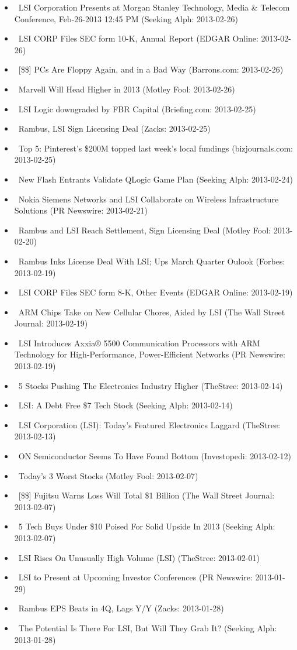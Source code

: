 \documentclass[11pt,asymmetric]{article}
\begin{document}
\begin{itemize}
\item\ LSI Corporation Presents at Morgan Stanley Technology, Media \& Telecom Conference, Feb-26-2013 12:45 PM (Seeking Alph: 2013-02-26)
\item\ LSI CORP Files SEC form 10-K, Annual Report (EDGAR Online: 2013-02-26)
\item\ [\$\$] PCs Are Floppy Again, and in a Bad Way (Barrons.com: 2013-02-26)
\item\ Marvell Will Head Higher in 2013 (Motley Fool: 2013-02-26)
\item\ LSI Logic downgraded by FBR Capital (Briefing.com: 2013-02-25)
\item\ Rambus, LSI Sign Licensing Deal (Zacks: 2013-02-25)
\item\ Top 5: Pinterest's \$200M topped last week's local fundings (bizjournals.com: 2013-02-25)
\item\ New Flash Entrants Validate QLogic Game Plan (Seeking Alph: 2013-02-24)
\item\ Nokia Siemens Networks and LSI Collaborate on Wireless Infrastructure Solutions (PR Newswire: 2013-02-21)
\item\ Rambus and LSI Reach Settlement, Sign Licensing Deal (Motley Fool: 2013-02-20)
\item\ Rambus Inks License Deal With LSI; Ups March Quarter Oulook (Forbes: 2013-02-19)
\item\ LSI CORP Files SEC form 8-K, Other Events (EDGAR Online: 2013-02-19)
\item\ ARM Chips Take on New Cellular Chores, Aided by LSI (The Wall Street Journal: 2013-02-19)
\item\ LSI Introduces Axxia® 5500 Communication Processors with ARM Technology for High-Performance, Power-Efficient Networks (PR Newswire: 2013-02-19)
\item\ 5 Stocks Pushing The Electronics Industry Higher (TheStree: 2013-02-14)
\item\ LSI: A Debt Free \$7 Tech Stock (Seeking Alph: 2013-02-14)
\item\ LSI Corporation (LSI): Today's Featured Electronics Laggard (TheStree: 2013-02-13)
\item\ ON Semiconductor Seems To Have Found Bottom (Investopedi: 2013-02-12)
\item\ Today's 3 Worst Stocks (Motley Fool: 2013-02-07)
\item\ [\$\$] Fujitsu Warns Loss Will Total \$1 Billion (The Wall Street Journal: 2013-02-07)
\item\ 5 Tech Buys Under \$10 Poised For Solid Upside In 2013 (Seeking Alph: 2013-02-07)
\item\ LSI Rises On Unusually High Volume (LSI) (TheStree: 2013-02-01)
\item\ LSI to Present at Upcoming Investor Conferences (PR Newswire: 2013-01-29)
\item\ Rambus EPS Beats in 4Q, Lags Y/Y (Zacks: 2013-01-28)
\item\ The Potential Is There For LSI, But Will They Grab It? (Seeking Alph: 2013-01-28)
\end{itemize}
\end{document}
